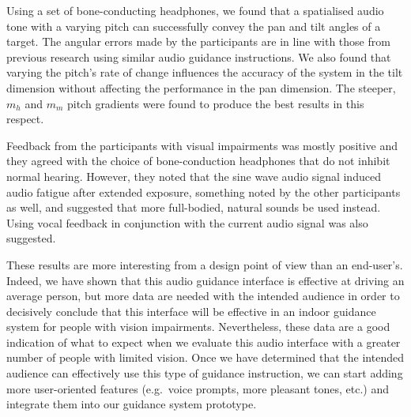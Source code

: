 \documentclass[sigconf, screen=true, anonymous=true]{acmart}
\begin{document}
Using a set of bone-conducting headphones, we found that a spatialised audio tone with a varying pitch can successfully convey the pan and tilt angles of a target.
The angular errors made by the participants are in line with those from previous research using similar audio guidance instructions.
We also found that varying the pitch's rate of change influences the accuracy of the system in the tilt dimension without affecting the performance in the pan dimension.
The steeper, $m_h$ and $m_m$ pitch gradients were found to produce the best results in this respect.

Feedback from the participants with visual impairments was mostly positive and they agreed with the choice of bone-conduction headphones that do not inhibit normal hearing.
However, they noted that the sine wave audio signal induced audio fatigue after extended exposure, something noted by the other participants as well, and suggested that more full-bodied, natural sounds be used instead.
Using vocal feedback in conjunction with the current audio signal was also suggested. 

These results are more interesting from a design point of view than an end-user's. 
Indeed, we have shown that this audio guidance interface is effective at driving an average person, but more data are needed with the intended audience in order to decisively conclude that this interface will be effective in an indoor guidance system for people with vision impairments. 
Nevertheless, these data are a good indication of what to expect when we evaluate this audio interface with a greater number of people with limited vision.
Once we have determined that the intended audience can effectively use this type of guidance instruction, we can start adding more user-oriented features (e.g.\ voice prompts, more pleasant tones, etc.) and integrate them into our guidance system prototype. 




\end{document}
